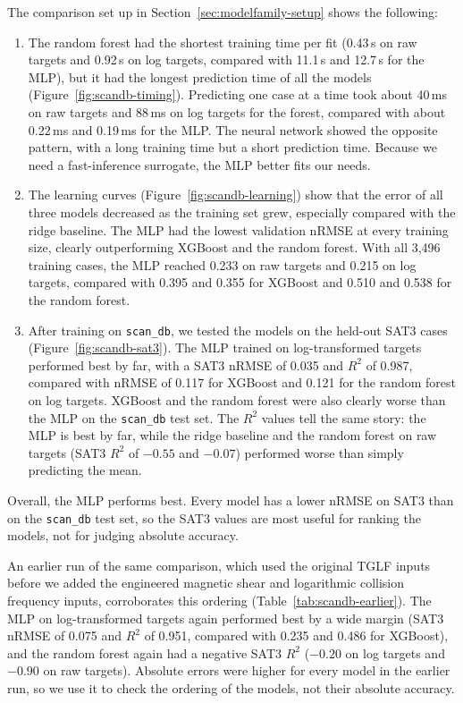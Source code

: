 \documentclass[12pt,letterpaper]{article}
\begin{document}
The comparison set up in Section~\ref{sec:modelfamily-setup} shows the following:
\begin{enumerate}
  \item The random forest had the shortest training time per fit (0.43\,s on
        raw targets and 0.92\,s on log targets, compared with 11.1\,s and
        12.7\,s for the MLP), but it had the longest prediction time of all
        the models (Figure~\ref{fig:scandb-timing}). Predicting one case at a
        time took about 40\,ms on raw targets and 88\,ms on log targets for
        the forest, compared with about 0.22\,ms and 0.19\,ms for the MLP. The
        neural network showed the opposite pattern, with a long training time
        but a short prediction time. Because we need a fast-inference
        surrogate, the MLP better fits our needs.
  \item The learning curves (Figure~\ref{fig:scandb-learning}) show that the
        error of all three models decreased as the training set grew,
        especially compared with the ridge baseline. The MLP had the lowest
        validation nRMSE at every training size, clearly outperforming
        XGBoost and the random forest. With all 3,496 training cases, the MLP
        reached 0.233 on raw targets and 0.215 on log targets, compared with
        0.395 and 0.355 for XGBoost and 0.510 and 0.538 for the random forest.
  \item After training on \texttt{scan\_db}, we tested the models on the
        held-out SAT3 cases (Figure~\ref{fig:scandb-sat3}). The MLP trained
        on log-transformed targets performed best by far, with a SAT3 nRMSE of
        0.035 and $R^2$ of 0.987, compared with nRMSE of 0.117 for XGBoost and
        0.121 for the random forest on log targets. XGBoost and the random
        forest were also clearly worse than the MLP on the \texttt{scan\_db}
        test set. The $R^2$ values tell the same story: the MLP is best by far,
        while the ridge baseline and the random forest on raw targets (SAT3
        $R^2$ of $-0.55$ and $-0.07$) performed worse than simply predicting
        the mean.
\end{enumerate}
Overall, the MLP performs best. Every model has a lower nRMSE on SAT3 than on
the \texttt{scan\_db} test set, so the SAT3 values are most useful for ranking
the models, not for judging absolute accuracy.

An earlier run of the same comparison, which used the original TGLF inputs
before we added the engineered magnetic shear and logarithmic collision
frequency inputs, corroborates this ordering (Table~\ref{tab:scandb-earlier}).
The MLP on log-transformed targets again performed best by a wide margin (SAT3
nRMSE of 0.075 and $R^2$ of 0.951, compared with 0.235 and 0.486 for XGBoost),
and the random forest again had a negative SAT3 $R^2$ ($-0.20$ on log targets
and $-0.90$ on raw targets). Absolute errors were higher for every model in the
earlier run, so we use it to check the ordering of the models, not their
absolute accuracy.
\end{document}
